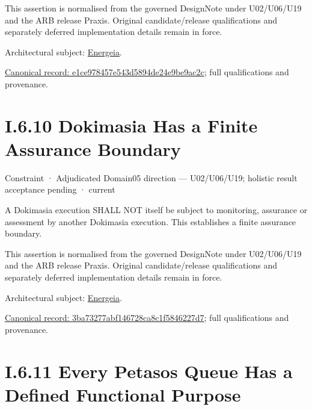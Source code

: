 This assertion is normalised from the governed DesignNote under U02/U06/U19 and the ARB release Praxis. Original candidate/release qualifications and separately deferred implementation details remain in force.



Architectural subject: \hyperref[element:fb3f37a6ac614415ac486a6de9d35994]{Energeia}.


{\footnotesize \href{../../../../continuum/motivation/constraint/e1ce978457e543d5894de24e9be9ac2c.md}{Canonical record: e1ce978457e543d5894de24e9be9ac2c}; full qualifications and provenance.}\par
\section*{I.6.10 Dokimasia Has a Finite Assurance Boundary}
\label{navigation:I.6.10}

\label{element:3ba73277abf146728ca8c1f5846227d7}
{\small Constraint · Adjudicated Domain05 direction — U02/U06/U19; holistic result acceptance pending · current}\par

A Dokimasia execution SHALL NOT itself be subject to monitoring, assurance or assessment by another Dokimasia execution. This establishes a finite assurance boundary.



This assertion is normalised from the governed DesignNote under U02/U06/U19 and the ARB release Praxis. Original candidate/release qualifications and separately deferred implementation details remain in force.



Architectural subject: \hyperref[element:fb3f37a6ac614415ac486a6de9d35994]{Energeia}.


{\footnotesize \href{../../../../continuum/motivation/constraint/3ba73277abf146728ca8c1f5846227d7.md}{Canonical record: 3ba73277abf146728ca8c1f5846227d7}; full qualifications and provenance.}\par
\section*{I.6.11 Every Petasos Queue Has a Defined Functional Purpose}
\label{navigation:I.6.11}

